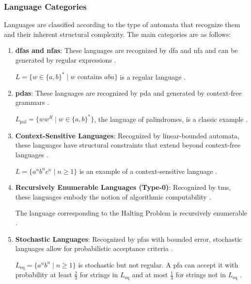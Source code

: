 \subsubsection{Language Categories}
Languages are classified according to the type of automata that recognize them and their inherent structural complexity. The main categories are as follows:

\begin{enumerate}
    \item \textbf{\glspl{dfa} and \glspl{nfa}}:  
    These languages are recognized by \gls{dfa} and \gls{nfa} and can be generated by regular expressions \cite{hopcroft2006introduction}. 
    \begin{example}
    $L = \{w \in \{a, b\}^\ast \mid w \text{ contains } aba\}$ is a regular language \cite{hopcroft2006introduction}.
    \end{example}
    
    \item \textbf{\glspl{pda}}:  
    These languages are recognized by \gls{pda} and generated by context-free grammars \cite{chomsky1956three, hopcroft2006introduction}.  
    \begin{example}
    $L_{\text{pal}} = \{ww^R \mid w \in \{a, b\}^\ast\}$, the language of palindromes, is a classic example \cite{chomsky1956three}.
    \end{example}

    \item \textbf{Context-Sensitive Languages}:  
    Recognized by linear-bounded automata, these languages have structural constraints that extend beyond context-free languages \cite{chomsky1956three, hopcroft2006introduction}.  
    \begin{example}
    $L = \{a^n b^n c^n \mid n \geq 1\}$ is an example of a context-sensitive language \cite{chomsky1956three}.
    \end{example}

    \item \textbf{Recursively Enumerable Languages (Type-0)}:  
    Recognized by \glspl{tm}, these languages embody the notion of algorithmic computability \cite{hopcroft2006introduction, turing1936computable}.  
    \begin{example}
    The language corresponding to the Halting Problem is recursively enumerable \cite{hopcroft2006introduction}.
    \end{example}

    \item \textbf{Stochastic Languages}:  
    Recognized by \glspl{pfa} with bounded error, stochastic languages allow for probabilistic acceptance criteria \cite{rabin1963probabilistic}.  
    \begin{example}
    $L_{\text{eq}} = \{a^n b^n \mid n \geq 1\}$ is stochastic but not regular. A \gls{pfa} can accept it with probability at least $\frac{2}{3}$ for strings in $L_{\text{eq}}$ and at most $\frac{1}{3}$ for strings not in $L_{\text{eq}}$ \cite{rabin1963probabilistic}.
    \end{example}
\end{enumerate}


